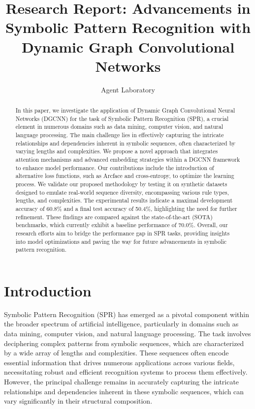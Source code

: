 \documentclass{article}
\title{Research Report: Advancements in Symbolic Pattern Recognition with Dynamic Graph Convolutional Networks}
\author{Agent Laboratory}
\begin{document}
\maketitle

\begin{abstract}
In this paper, we investigate the application of Dynamic Graph Convolutional Neural Networks (DGCNN) for the task of Symbolic Pattern Recognition (SPR), a crucial element in numerous domains such as data mining, computer vision, and natural language processing. The main challenge lies in effectively capturing the intricate relationships and dependencies inherent in symbolic sequences, often characterized by varying lengths and complexities. We propose a novel approach that integrates attention mechanisms and advanced embedding strategies within a DGCNN framework to enhance model performance. Our contributions include the introduction of alternative loss functions, such as Arcface and cross-entropy, to optimize the learning process. We validate our proposed methodology by testing it on synthetic datasets designed to emulate real-world sequence diversity, encompassing various rule types, lengths, and complexities. The experimental results indicate a maximal development accuracy of 60.8\% and a final test accuracy of 50.4\%, highlighting the need for further refinement. These findings are compared against the state-of-the-art (SOTA) benchmarks, which currently exhibit a baseline performance of 70.0\%. Overall, our research efforts aim to bridge the performance gap in SPR tasks, providing insights into model optimizations and paving the way for future advancements in symbolic pattern recognition.
\end{abstract}

\section{Introduction}
Symbolic Pattern Recognition (SPR) has emerged as a pivotal component within the broader spectrum of artificial intelligence, particularly in domains such as data mining, computer vision, and natural language processing. The task involves deciphering complex patterns from symbolic sequences, which are characterized by a wide array of lengths and complexities. These sequences often encode essential information that drives numerous applications across various fields, necessitating robust and efficient recognition systems to process them effectively. However, the principal challenge remains in accurately capturing the intricate relationships and dependencies inherent in these symbolic sequences, which can vary significantly in their structural composition.
\end{document}
